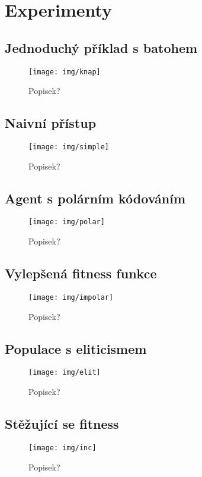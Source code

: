 \chapter{Experimenty}

\section{Jednoduchý příklad s batohem}
\begin{figure}[p]\centering
\texttt{[image: img/knap]}
\caption{Popisek?}
\label{exp:1}

\end{figure}


\section{Naivní přístup}
\begin{figure}[p]\centering
\texttt{[image: img/simple]}
\caption{Popisek?}
\label{exp:1}
\end{figure}


\section{Agent s polárním kódováním}
\begin{figure}[p]\centering
\texttt{[image: img/polar]}
\caption{Popisek?}
\label{exp:1}
\end{figure}


\section{Vylepšená fitness funkce}
\begin{figure}[p]\centering
\texttt{[image: img/impolar]}
\caption{Popisek?}
\label{exp:1}
\end{figure}


\section{Populace s eliticismem}
\begin{figure}[p]\centering
\texttt{[image: img/elit]}
\caption{Popisek?}
\label{exp:1}
\end{figure}


\section{Stěžující se fitness}
\begin{figure}[p]\centering
\texttt{[image: img/inc]}
\caption{Popisek?}
\label{exp:1}
\end{figure}
